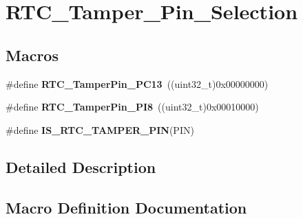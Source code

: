 \hypertarget{group___r_t_c___tamper___pin___selection}{}\section{R\+T\+C\+\_\+\+Tamper\+\_\+\+Pin\+\_\+\+Selection}
\label{group___r_t_c___tamper___pin___selection}
\subsection*{Macros}
\begin{DoxyCompactItemize}
\item 
\hypertarget{group___r_t_c___tamper___pin___selection_ga40931f48b0d647e0a1e96f12e1321bd1}{}\#define {\bfseries R\+T\+C\+\_\+\+Tamper\+Pin\+\_\+\+P\+C13}~((uint32\+\_\+t)0x00000000)\label{group___r_t_c___tamper___pin___selection_ga40931f48b0d647e0a1e96f12e1321bd1}

\item 
\hypertarget{group___r_t_c___tamper___pin___selection_gafef092b812feb1d759c7b6cd0ca8d858}{}\#define {\bfseries R\+T\+C\+\_\+\+Tamper\+Pin\+\_\+\+P\+I8}~((uint32\+\_\+t)0x00010000)\label{group___r_t_c___tamper___pin___selection_gafef092b812feb1d759c7b6cd0ca8d858}

\item 
\#define {\bfseries I\+S\+\_\+\+R\+T\+C\+\_\+\+T\+A\+M\+P\+E\+R\+\_\+\+P\+I\+N}(P\+I\+N)
\end{DoxyCompactItemize}


\subsection{Detailed Description}


\subsection{Macro Definition Documentation}
\hypertarget{group___r_t_c___tamper___pin___selection_gafee4c4fb7be2053b14b061e5725561ee}{}
